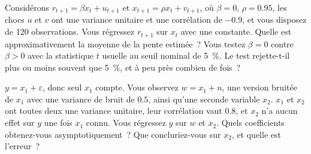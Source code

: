 \begin{question}\label{iq:iv1:regression:29}
Considérons $r_{t+1} = \beta x_t + u_{t+1}$ et $x_{t+1} = \rho x_t + v_{t+1}$, où $\beta = 0$, $\rho = 0.95$, les chocs $u$ et $v$ ont une variance unitaire et une corrélation de $-0.9$, et vous disposez de 120 observations. Vous régressez $r_{t+1}$ sur $x_t$ avec une constante. Quelle est approximativement la moyenne de la pente estimée~? Vous testez $\beta = 0$ contre $\beta > 0$ avec la statistique $t$ usuelle au seuil nominal de 5~\%. Le test rejette-t-il plus ou moins souvent que 5~\%, et à peu près combien de fois~?
\end{question}

\begin{question}\label{iq:iv1:regression:30}
$y = x_1 + \varepsilon$, donc seul $x_1$ compte. Vous observez $w = x_1 + n$, une version bruitée de $x_1$ avec une variance de bruit de $0.5$, ainsi qu'une seconde variable $x_2$. $x_1$ et $x_2$ ont toutes deux une variance unitaire, leur corrélation vaut $0.8$, et $x_2$ n'a aucun effet sur $y$ une fois $x_1$ connu. Vous régressez $y$ sur $w$ et $x_2$. Quels coefficients obtenez-vous asymptotiquement~? Que concluriez-vous sur $x_2$, et quelle est l'erreur~?
\end{question}
